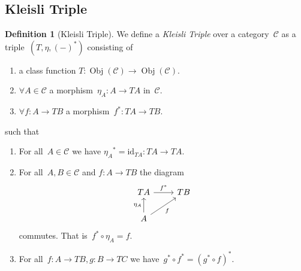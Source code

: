 \documentclass[a4paper]{article}
\theoremstyle{plain}
\theoremstyle{definition}
\newtheorem{definition}[theorem]{Definition}
\DeclareMathOperator{\Obj}{Obj}
\newcommand{\id}{\mathrm{id}}
\newcommand{\cat}[1]{\mathcal{#1}}
\begin{document}
\subsection{Kleisli Triple}
\begin{definition}[Kleisli Triple]
    \label{def:kleisli-triple}
    We define a \emph{Kleisli Triple} over a category~\(\cat{C}\)
    as a triple~\((T, \eta, (-)^{\ast})\) consisting of
    \begin{enumerate}
        \item a class function
            \(T:\Obj(\cat{C})\longrightarrow\Obj(\cat{C})\).
        \item \(\forall A\in\cat{C}\)
            a morphism~\(\eta_{A}:A\longrightarrow TA\)
            in~\(\cat{C}\).
        \item \(\forall f:A\longrightarrow TB\)
            a morphism~\(f^{\ast}:TA\longrightarrow TB\).
    \end{enumerate}
    such that
    \begin{enumerate}
        \item For all~\(A\in\cat{C}\) we have
            \({\eta_{A}}^{\ast} = \id_{TA}:TA\longrightarrow TA\).
        \item For all~\(A,B\in\cat{C}\)
            and \(f:A\longrightarrow TB\)
            the diagram
            \[\begin{tikzcd}
                TA \arrow[r, "f^{\ast}"] & TB \\
                A \arrow[u, "\eta_{A}"] \arrow[ur, "f", swap] &
            \end{tikzcd}\]
            commutes. That is~\(f^{\ast}\circ\eta_{A} = f\).
        \item For all~\(f:A\to TB,g:B\to TC\) we
            have~\(g^{\ast}\circ f^{\ast} = (g^{\ast}\circ f)^{\ast}\).
    \end{enumerate}
\end{definition}
\end{document}
